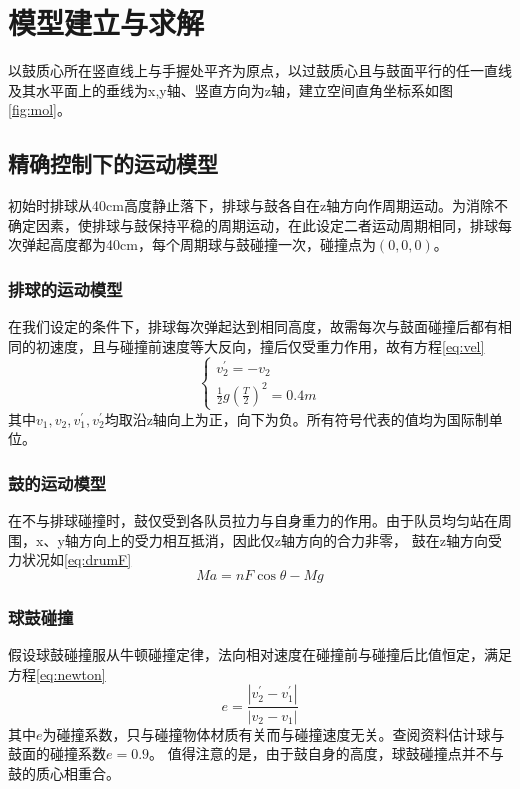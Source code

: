 \documentclass[withoutpreface,bwprint]{cumcmthesis} %
\begin{document}
\section{模型建立与求解}
以鼓质心所在竖直线上与手握处平齐为原点，以过鼓质心且与鼓面平行的任一直线及其水平面上的垂线为x,y轴、竖直方向为z轴，建立空间直角坐标系如图\ref{fig:mol}。

\subsection{精确控制下的运动模型}
初始时排球从40cm高度静止落下，排球与鼓各自在z轴方向作周期运动。为消除不确定因素，使排球与鼓保持平稳的周期运动，在此设定二者运动周期相同，排球每次弹起高度都为40cm，每个周期球与鼓碰撞一次，碰撞点为$(0,0,0)$。
\subsubsection{排球的运动模型}
在我们设定的条件下，排球每次弹起达到相同高度，故需每次与鼓面碰撞后都有相同的初速度，且与碰撞前速度等大反向，撞后仅受重力作用，故有方程\ref{eq:vel}
\begin{equation}
\left\{
\begin{array}{lr}
v_2^{'}=-v_2 \\
\frac{1}{2}g(\frac{T}{2})^2=0.4m
\end{array}
\right.
\label{eq:vel}
\end{equation}
其中$v_1, v_2, v_1^{'}, v_2^{'}$均取沿z轴向上为正，向下为负。所有符号代表的值均为国际制单位。
\subsubsection{鼓的运动模型}
在不与排球碰撞时，鼓仅受到各队员拉力与自身重力的作用。由于队员均匀站在周围，x、y轴方向上的受力相互抵消，因此仅z轴方向的合力非零，
鼓在z轴方向受力状况如\ref{eq:drumF}
\begin{equation}
Ma=nF\cos\theta-Mg
\label{eq:drumF}
\end{equation}
\subsubsection{球鼓碰撞}
假设球鼓碰撞服从牛顿碰撞定律，法向相对速度在碰撞前与碰撞后比值恒定，满足方程\ref{eq:newton}
\begin{equation}
	e=\frac{|v_2^{'}-v_1^{'}|}{|v_2-v_1|}
	\label{eq:newton}
\end{equation} 
其中$e$为碰撞系数，只与碰撞物体材质有关而与碰撞速度无关。查阅资料估计球与鼓面的碰撞系数$e=0.9$。
值得注意的是，由于鼓自身的高度，球鼓碰撞点并不与鼓的质心相重合。
\end{document}
